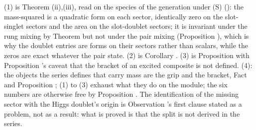 (1) is Theorem (ii),(iii), read on the species of the generation under (S) (): the mass-squared is a quadratic form on each sector, identically zero on the slot-singlet sectors and the area on the slot-doublet sectors; it is invariant under the rung mixing by Theorem  but not under the pair mixing (Proposition ), which is why the doublet entries are forms on their sectors rather than scalars, while the zeros are exact whatever the pair state. (2) is Corollary . (3) is Proposition  with Proposition 's caveat that the bracket of an excited composite is not defined. (4): the objects the series defines that carry mass are the grip and the bracket, Fact  and Proposition ; (1) to (3) exhaust what they do on the module; the six numbers are otherwise free by Proposition . The identification of the missing sector with the Higgs doublet's origin is Observation 's first clause stated as a problem, not as a result: what is proved is that the split is not derived in the series.

